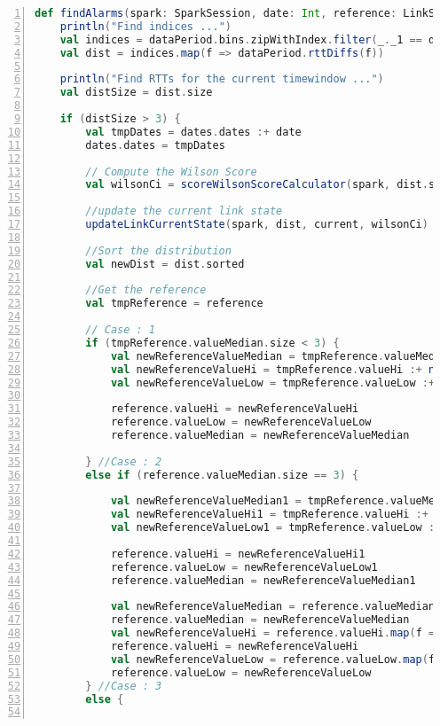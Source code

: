 \begin{lstlisting}[language=scala,firstnumber=1, caption={Définition de la méthode findAlarms},label={lst:findAlarmsFunction}, basicstyle = \footnotesize,escapechar=|,numbers=left,
stepnumber=1]
  def findAlarms(spark: SparkSession, date: Int, reference: LinkState, dataPeriod: ResumedLink, current: LinkState, alarmsDates: AlarmsDates, alarmsValues: AlarmsValues, dates: AllDates): Unit = {
	println("Find indices ...")
	val indices = dataPeriod.bins.zipWithIndex.filter(_._1 == date).map(_._2)
	val dist = indices.map(f => dataPeriod.rttDiffs(f))
	
	println("Find RTTs for the current timewindow ...")
	val distSize = dist.size
	
	if (distSize > 3) {
		val tmpDates = dates.dates :+ date
		dates.dates = tmpDates
		
		// Compute the Wilson Score
		val wilsonCi = scoreWilsonScoreCalculator(spark, dist.size).map(f => f * dist.size)
		
		//update the current link state
		updateLinkCurrentState(spark, dist, current, wilsonCi)
		
		//Sort the distribution
		val newDist = dist.sorted
		
		//Get the reference
		val tmpReference = reference
		
		// Case : 1
		if (tmpReference.valueMedian.size < 3) {
			val newReferenceValueMedian = tmpReference.valueMedian :+ current.valueMedian.last
			val newReferenceValueHi = tmpReference.valueHi :+ newDist(javatools.JavaTools.getIntegerPart(wilsonCi(1)))
			val newReferenceValueLow = tmpReference.valueLow :+ newDist(javatools.JavaTools.getIntegerPart(wilsonCi(0)))
			
			reference.valueHi = newReferenceValueHi
			reference.valueLow = newReferenceValueLow
			reference.valueMedian = newReferenceValueMedian
			
		} //Case : 2
		else if (reference.valueMedian.size == 3) {
			
			val newReferenceValueMedian1 = tmpReference.valueMedian :+ medianCalculator(tmpReference.valueMedian)
			val newReferenceValueHi1 = tmpReference.valueHi :+ medianCalculator(tmpReference.valueHi)
			val newReferenceValueLow1 = tmpReference.valueLow :+ medianCalculator(tmpReference.valueLow)
			
			reference.valueHi = newReferenceValueHi1
			reference.valueLow = newReferenceValueLow1
			reference.valueMedian = newReferenceValueMedian1
			
			val newReferenceValueMedian = reference.valueMedian.map(f => reference.valueMedian.last)
			reference.valueMedian = newReferenceValueMedian
			val newReferenceValueHi = reference.valueHi.map(f => reference.valueHi.last)
			reference.valueHi = newReferenceValueHi
			val newReferenceValueLow = reference.valueLow.map(f => reference.valueLow.last)
			reference.valueLow = newReferenceValueLow
		} //Case : 3
		else {
			

\end{lstlisting}
